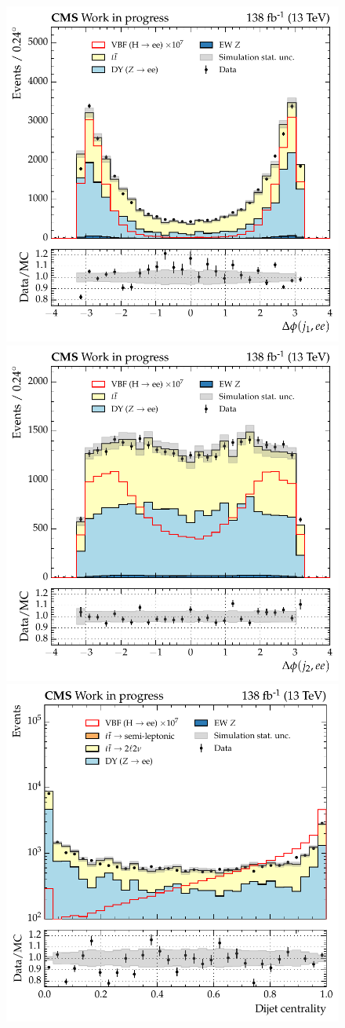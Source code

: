 \begin{figure}[htbp!]
\centering
\includegraphics[width =0.33\linewidth]{Figures/Hee/VBF/dataMC/all_inputs/VBF_BDT_leadJetDieleDPhi.pdf}\hfill%
\includegraphics[width =0.33\linewidth]{Figures/Hee/VBF/dataMC/all_inputs/VBF_BDT_subleadJetDieleDPhi.pdf}\hfill%
\includegraphics[width =0.33\linewidth]{Figures/Hee/VBF/dataMC/all_inputs/VBF_BDT_dijetCentrality.pdf}\hfill%
 

\end{figure}
